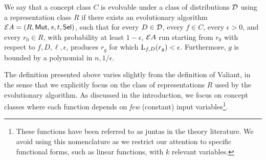 \begin{definition} We say that a
concept class $C$ is evolvable under a class of distributions ${\mathcal D}$ using a
representation class $R$ if there exists an evolutionary algorithm ${\mathcal EA} =
(R, \mathsf{Mut}, s, t, \mathsf{Sel})$, such that for every $D \in {\mathcal D}$, every $f \in C$,
every $\epsilon > 0$, and every $r_0 \in R$, with probability at least $1 -
\epsilon$, ${\mathcal EA}$ run starting from $r_0$ with respect to $f, D, \ell, \epsilon$,
produces $r_g$ for which $\mathrm{L}_{f, D}(r_g) < \epsilon$. Furthermore, $g$ is
bounded by a polynomial in $n, 1/\epsilon$.  \end{definition}

The definition presented above varies slightly from the definition of Valiant,
in the sense that we explicitly focus on the class of representations $R$ used
by the evolutionary algorithm. As discussed in the introduction, we focus on
concept classes where each function depends on \emph{few} (constant) input
variables\footnote{These functions have been referred to as juntas in the theory
literature. We avoid using this nomenclature as we restrict our attention to
specific functional forms, such as linear functions, with $k$ relevant
variables.}. 

